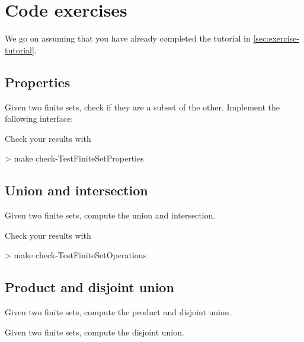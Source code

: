 

\section{Code exercises}

We go on assuming that you have already completed the tutorial in \cref{sec:exercise-tutorial}.

\subsection{Properties}

\begin{gradedexercise}
  Given two finite sets, check if they are a subset of the other.
  Implement the following interface:
\end{gradedexercise}

Check your results with
\begin{console}
  > make check-TestFiniteSetProperties
\end{console}

\subsection{Union and intersection}


\begin{gradedexercise}
  Given two finite sets, compute the union and intersection.
\end{gradedexercise}


Check your results with
\begin{console}
  > make check-TestFiniteSetOperations
\end{console}

\subsection{Product and disjoint union}

\begin{gradedexercise}
  Given two finite sets, compute the product and disjoint union.

\end{gradedexercise}
\begin{gradedexercise}
  Given two finite sets, compute the disjoint union.

\end{gradedexercise}





